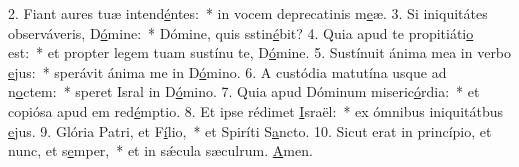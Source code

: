 2. Fiant aures tuæ intend\uline{é}ntes:~* in vocem deprecatinis m\uline{e}æ.
3. Si iniquitátes observáveris, D\uline{ó}mine:~* Dómine, quis sstin\uline{é}bit?
4. Quia apud te propitiáti\uline{o} est:~* et propter legem tuam sustínu te, D\uline{ó}mine.
5. Sustínuit ánima mea in verbo \uline{e}jus:~* sperávit ánima me in D\uline{ó}mino.
6. A custódia matutína usque ad n\uline{o}ctem:~* speret Isral in D\uline{ó}mino.
7. Quia apud Dóminum miseric\uline{ó}rdia:~* et copiósa apud em red\uline{é}mptio.
8. Et ipse rédimet \uline{I}sraël:~* ex ómnibus iniquitátbus \uline{e}jus.
9. Glória Patri, et F\uline{í}lio,~* et Spiríti S\uline{a}ncto.
10. Sicut erat in princípio, et nunc, et s\uline{e}mper,~* et in sǽcula sæculrum. \uline{A}men.
